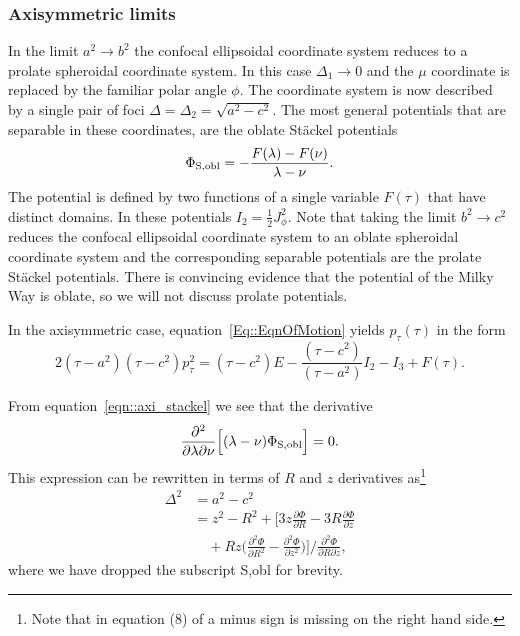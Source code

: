 \documentclass[useAMS,usenatbib,fleqn,a4paper]{mn2e}
\begin{document}
\subsubsection{Axisymmetric limits}

In the limit $a^2\rightarrow b^2$ the confocal ellipsoidal coordinate system
reduces to a prolate spheroidal coordinate system. In this case $\Delta_1\rightarrow0$ and the $\mu$
coordinate is replaced by the familiar polar angle $\phi$. The coordinate system is now described by a single pair of foci $\Delta=\Delta_2=\sqrt{a^2-c^2}$. The most general
potentials that are separable  in these coordinates, are the oblate St\"ackel potentials
\begin{equation}
\Phi_{\rm S,obl} = -\frac{F(\lambda)-F(\nu)}{\lambda-\nu}.
\label{eqn::axi_stackel}
\end{equation}
 The potential is defined by two functions of a single variable $F(\tau)$
that have distinct domains. In these potentials $I_2=\frac{1}{2}J_\phi^2$.
Note that taking the limit $b^2 \rightarrow c^2$ reduces the confocal
ellipsoidal coordinate system to an oblate spheroidal coordinate
system and the corresponding separable potentials are the prolate St\"ackel
potentials. There is convincing evidence that the potential of the Milky Way
is oblate, so we will not discuss prolate potentials.

In the axisymmetric case,
equation~\eqref{Eq::EqnOfMotion} yields $p_\tau(\tau)$ in the form
\begin{equation}
2(\tau-a^2)(\tau-c^2)p_\tau^2=(\tau-c^2)E-\frac{(\tau-c^2)}{(\tau-a^2)}I_2-I_3+F(\tau).
\label{Eq::EqnOfMotionAxi}
\end{equation}

From equation~\eqref{eqn::axi_stackel} we see that the derivative
\[
\frac{\partial^2}{\partial\lambda\partial\nu}\Big[(\lambda-\nu)\Phi_{\rm S,obl}\Big]=0.
\]
This expression can be rewritten in terms of $R$ and $z$ derivatives
as\footnote{Note that in equation (8) of \cite{Sanders2012a} a minus sign is
missing on the right hand side.}
\begin{equation}
\begin{split}
\Delta^2 &= a^2-c^2 \\
&= z^2-R^2+\Big[3z\frac{\partial \Phi}{\partial R}
-3R\frac{\partial \Phi}{\partial z}\\
&\quad+Rz\Big(\frac{\partial^2 \Phi}{\partial R^2}-\frac{\partial^2 \Phi}{\partial
z^2}\Big)\Big]\bigg/\frac{\partial^2 \Phi}{\partial R\partial z},
\end{split}
\label{DeltaGuess}
\end{equation}
where we have dropped the subscript S,obl for brevity.
\end{document}
